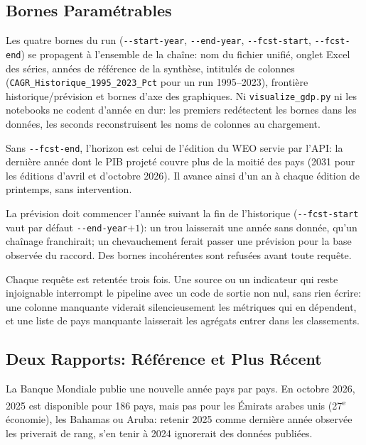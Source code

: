 \documentclass[11pt,a4paper]{article}
\begin{document}
\subsection{Bornes Paramétrables}
Les quatre bornes du run (\texttt{-{}-start-year}, \texttt{-{}-end-year}, \texttt{-{}-fcst-start}, \texttt{-{}-fcst-end}) se propagent à l'ensemble de la chaîne: nom du fichier unifié, onglet Excel des séries, années de référence de la synthèse, intitulés de colonnes (\texttt{CAGR\_Historique\_1995\_2023\_Pct} pour un run 1995--2023), frontière historique/prévision et bornes d'axe des graphiques. Ni \texttt{visualize\_gdp.py} ni les notebooks ne codent d'année en dur: les premiers redétectent les bornes dans les données, les seconds reconstruisent les noms de colonnes au chargement.

Sans \texttt{-{}-fcst-end}, l'horizon est celui de l'édition du WEO servie par l'API: la dernière année dont le PIB projeté couvre plus de la moitié des pays (2031 pour les éditions d'avril et d'octobre 2026). Il avance ainsi d'un an à chaque édition de printemps, sans intervention.

La prévision doit commencer l'année suivant la fin de l'historique (\texttt{-{}-fcst-start} vaut par défaut \texttt{-{}-end-year}$+1$): un trou laisserait une année sans donnée, qu'un chaînage franchirait; un chevauchement ferait passer une prévision pour la base observée du raccord. Des bornes incohérentes sont refusées avant toute requête.

Chaque requête est retentée trois fois. Une source ou un indicateur qui reste injoignable interrompt le pipeline avec un code de sortie non nul, sans rien écrire: une colonne manquante viderait silencieusement les métriques qui en dépendent, et une liste de pays manquante laisserait les agrégats entrer dans les classements.

\subsection{Deux Rapports: Référence et Plus Récent}
La Banque Mondiale publie une nouvelle année pays par pays. En octobre 2026, 2025 est disponible pour 186 pays, mais pas pour les Émirats arabes unis (27\textsuperscript{e} économie), les Bahamas ou Aruba: retenir 2025 comme dernière année observée les priverait de rang, s'en tenir à 2024 ignorerait des données publiées.
\end{document}
